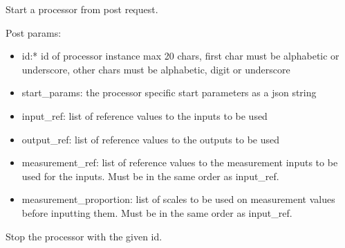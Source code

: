 \documentclass[letterpaper,10pt,english]{sphinxmanual}
\begin{document}
\begin{fulllineitems}
\label{\detokenize{src.processors:src.processors.views.processor_start}}
Start a processor from post request.

Post params:
\begin{itemize}
\item {} 
id:* id of processor instance
max 20 chars, first char must be alphabetic or underscore, other chars must be alphabetic, digit or underscore

\item {} 
start\_params: the processor specific start parameters as a json string

\item {} 
input\_ref: list of reference values to the inputs to be used

\item {} 
output\_ref: list of reference values to the outputs to be used

\item {} 
measurement\_ref: list of reference values to the measurement inputs to be used for the inputs.
Must be in the same order as input\_ref.

\item {} 
measurement\_proportion: list of scales to be used on measurement values before inputting them.
Must be in the same order as input\_ref.

\end{itemize}

\end{fulllineitems}


\begin{fulllineitems}
\label{\detokenize{src.processors:src.processors.views.processor_stop}}
Stop the processor with the given id.

\end{fulllineitems}

\end{document}
